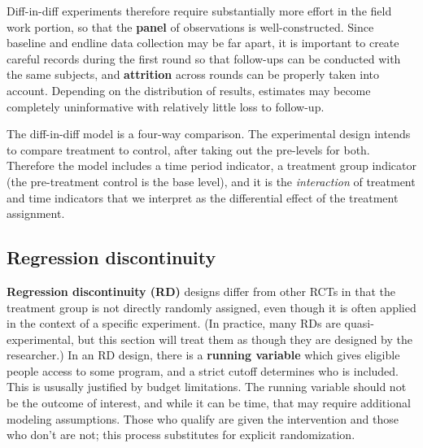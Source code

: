 Diff-in-diff experiments therefore require substantially more effort
in the field work portion, so that the \textbf{panel} of observations is well-constructed.
Since baseline and endline data collection may be far apart,
it is important to create careful records during the first round
so that follow-ups can be conducted with the same subjects,
and \textbf{attrition} across rounds can be properly taken into account.
Depending on the distribution of results,
estimates may become completely uninformative
with relatively little loss to follow-up.

The diff-in-diff model is a four-way comparison.
The experimental design intends to compare treatment to control,
after taking out the pre-levels for both.
Therefore the model includes a time period indicator,
a treatment group indicator (the pre-treatment control is the base level),
and it is the \textit{interaction} of treatment and time indicators
that we interpret as the differential effect of the treatment assignment.

\subsection{Regression discontinuity}

\textbf{Regression discontinuity (RD)} designs differ from other RCTs
in that the treatment group is not directly randomly assigned,
even though it is often applied in the context of a specific experiment.
(In practice, many RDs are quasi-experimental, but this section
will treat them as though they are designed by the researcher.)
In an RD design, there is a \textbf{running variable}
which gives eligible people access to some program,
and a strict cutoff determines who is included.\cite{lee2010regression}
This is ususally justified by budget limitations.
The running variable should not be the outcome of interest,
and while it can be time, that may require additional modeling assumptions.
Those who qualify are given the intervention and those who don't are not;
this process substitutes for explicit randomization.

